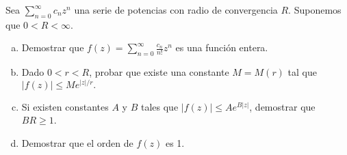 \documentclass[twoside]{article}
\begin{document}
\newpage
\begin{ejercicio}{3}
Sea $\sum_{n=0}^\infty c_n z^n$ una serie de potencias con  radio de convergencia  $R$. Suponemos que $0<R<\infty$.  
\begin{enumerate}[a)]
\item  Demostrar que 
$\displaystyle{f(z)=\sum_{n=0}^\infty \frac{c_n}{n!}z^n}$
es una función  entera. 
\item  Dado $0<r<R$, probar que existe una constante $M=M(r)$ tal que 
$|f(z)|\le Me^{|z|/r}.$
\item  Si existen constantes $A$ y $B$ tales que $|f(z)|\le A e^{B|z|}$, demostrar que 
$BR\ge 1$.
\item Demostrar que el orden de $f(z)$ es 1.
\end{enumerate}
\end{ejercicio}
\end{document}
